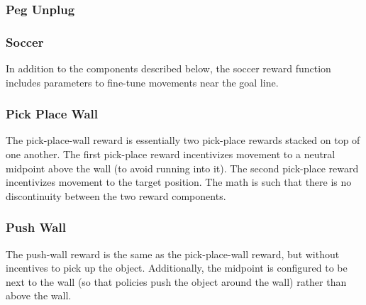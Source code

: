 {\subsubsection{Peg Unplug}



\subsubsection{Soccer}
In addition to the components described below, the soccer reward function includes parameters to fine-tune movements near the goal line.


\subsubsection{Pick Place Wall}
The pick-place-wall reward is essentially two pick-place rewards stacked on top of one another. The first pick-place reward incentivizes movement to a neutral midpoint above the wall (to avoid running into it). The second pick-place reward incentivizes movement to the target position. The math is such that there is no discontinuity between the two reward components.

\subsubsection{Push Wall}
The push-wall reward is the same as the pick-place-wall reward, but without incentives to pick up the object. Additionally, the midpoint is configured to be next to the wall (so that policies push the object around the wall) rather than above the wall.
}


